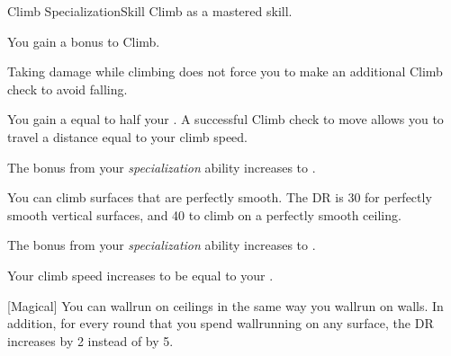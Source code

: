     \begin{feat}{Climb Specialization}{Skill}
        \featpre Climb as a mastered skill.

         You gain a  bonus to Climb.

         Taking damage while climbing does not force you to make an additional Climb check to avoid falling.

         You gain a  equal to half your .
        A successful Climb check to move allows you to travel a distance equal to your climb speed.

         The bonus from your \textit{specialization} ability increases to .

         You can climb surfaces that are perfectly smooth.
        The DR is 30 for perfectly smooth vertical surfaces, and 40 to climb on a perfectly smooth ceiling.

         The bonus from your \textit{specialization} ability increases to .

         Your climb speed increases to be equal to your .

        [Magical] You can wallrun on ceilings in the same way you wallrun on walls.
        In addition, for every round that you spend wallrunning on any surface, the DR increases by 2 instead of by 5.
    \end{feat}

